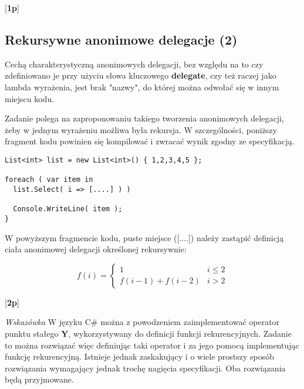   [{\bf 1p}]	 
  
\subsection{Rekursywne anonimowe delegacje (2)}

Cechą charakterystyczną anonimowych delegacji, bez względu na to czy zdefiniowano je przy użyciu słowa
\label{rekursja_anonimowych}
kluczowego {\bf delegate}, czy też raczej jako lambda wyrażenia, jest brak "nazwy", do której można odwołać się
w innym miejscu kodu. 

Zadanie polega na zaproponowaniu takiego tworzenia anonimowych delegacji, żeby w jednym wyrażeniu możliwa
była rekursja. W szczególności, poniższy fragment kodu powinien się kompilować i zwracać wynik zgodny ze specyfikacją.

\begin{verbatim}
List<int> list = new List<int>() { 1,2,3,4,5 };   

foreach ( var item in 
  list.Select( i => [....] ) )   
	
  Console.WriteLine( item );   
}
\end{verbatim}

W powyższym fragmencie kodu, puste miejsce ([....]) należy zastąpić definicją ciała anonimowej delegacji
określonej rekursywnie:

$$
f(i) = \left\{ \begin{array}{ll}
                               1 & i \leq 2 \\
                               f(i-1) + f(i-2) & i > 2
                               \end{array}
                       \right.  
$$

 [{\bf 2p}]	 

{\em Wskazówka} W języku C\# można z powodzeniem zaimplementować operator punktu stałego {\bf Y}, wykorzystywany do definicji funkcji rekurencyjnych. 
Zadanie to można rozwiązać więc definiując taki operator i za jego pomocą implementując funkcję rekurencyjną. Istnieje jednak zaskakujący i o wiele
prostszy sposób rozwiązania wymagający jednak trochę nagięcia specyfikacji. Oba rozwiązania będą przyjmowane.